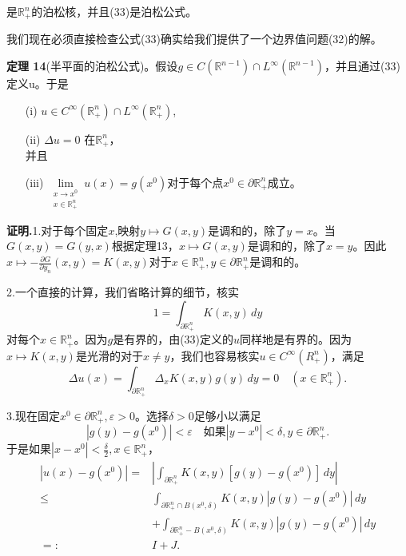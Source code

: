\documentclass[leqno]{article}
\numberwithin{equation}{subsection}%
\begin{document}
是$\mathbb{R}_{+}^{n}$的泊松核，并且(33)是泊松公式。
\par
我们现在必须直接检查公式(33)确实给我们提供了一个边界值问题(32)的解。
\par
\noindent\textbf{定理 14}(半平面的泊松公式)。假设$g\in C(\mathbb{R}^{n-1})\cap L^{\infty}(\mathbb{R}^{n-1})$，并且通过(33)定义u。于是
\begin{enumerate}[fullwidth,itemindent=2em]
	\item[(i)]$u\in C^{\infty}(\mathbb{R}_{+}^{n})\cap L^{\infty}(\mathbb{R}_{+}^{n})$,
	\item[(ii)]$\Delta u=0$ 在$\mathbb{R}_{+}^{n}$，\\
	并且\vspace{-2ex}
	\item[(iii)]$\lim\limits_{\substack{x\rightarrow x^{0}\\x\in\mathbb{R}_{+}^{n}}}u(x)=g(x^{0})$对于每个点$x^{0}\in\partial\mathbb{R}_{+}^{n}$成立。 
\end{enumerate}
\par
\noindent\textbf{证明.}1.对于每个固定$x$,映射$y\mapsto G(x,y)$是调和的，除了$y=x$。当$G(x,y)=G(y,x)$根据定理13，$x\mapsto G(x,y)$是调和的，除了$x=y$。因此$x\mapsto -\frac{\partial G}{\partial y_{n}}(x,y)=K(x,y)$对于$x\in\mathbb{R}_{+}^{n},y\in\partial\mathbb{R}_{+}^{n}$是调和的。
\par
2.一个直接的计算，我们省略计算的细节，核实
\begin{equation}
1=\int_{\partial\mathbb{R}_{+}^{n}}K(x,y)\,dy
\end{equation}
对每个$x\in\mathbb{R}_{+}^{n}$。因为$g$是有界的，由(33)定义的$u$同样地是有界的。因为$x\mapsto K(x,y)$是光滑的对于$x\neq y$，我们也容易核实$u\in C^{\infty}(R_{+}^{n})$，满足
\begin{equation*}
\Delta u(x)=\int_{\partial \mathbb{R}_{+}^{n}}\Delta_{x}K(x,y)g(y)\,dy=0\quad(x\in\mathbb{R}_{+}^{n}).
\end{equation*}
\par
3.现在固定$x^{0}\in\partial\mathbb{R}_{+}^{n},\varepsilon>0$。选择$\delta>0$足够小以满足
\begin{equation}
|g(y)-g(x^{0})|<\varepsilon\quad\text{如果}|y-x^{0}|<\delta,y\in\partial\mathbb{R}_{+}^{n}.
\end{equation}
于是如果$|x-x^{0}|<\frac{\delta}{2},x\in\mathbb{R}_{+}^{n}$，
\begin{equation}
\begin{aligned}
|u(x)-g(x^{0})|=&\left|\int_{\partial\mathbb{R}_{+}^{n}}K(x,y)\left[g(y)-g(x^{0})\right]\,dy\right|\\
\leq&\int_{\partial\mathbb{R}_{+}^{n}\cap B(x^{0},\delta)}K(x,y)|g(y)-g(x^{0})|\,dy\\
&+\int_{\partial\mathbb{R}_{+}^{n}-B(x^{0},\delta)}K(x,y)|g(y)-g(x^{0})|\,dy\\
=:&I+J.
\end{aligned}
\end{equation}
\end{document}
